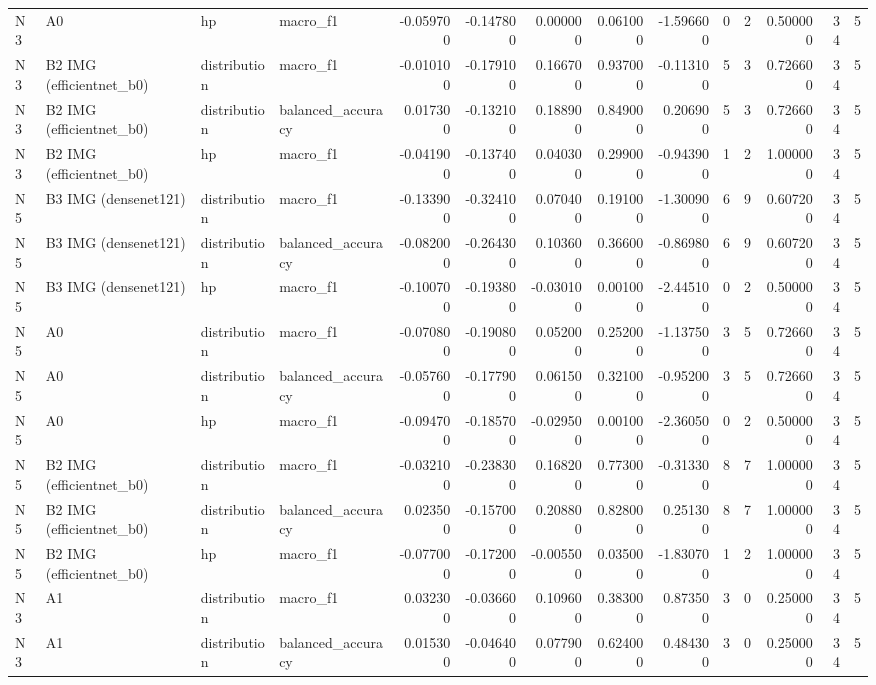 \begin{table}
\begin{tabular}{llllrrrrrrrrrr}
N3 & A0 & hp & macro\_f1 & -0.059700 & -0.147800 & 0.000000 & 0.061000 & -1.596600 & 0 & 2 & 0.500000 & 34 & 5 \\
N3 & B2 IMG (efficientnet\_b0) & distribution & macro\_f1 & -0.010100 & -0.179100 & 0.166700 & 0.937000 & -0.113100 & 5 & 3 & 0.726600 & 34 & 5 \\
N3 & B2 IMG (efficientnet\_b0) & distribution & balanced\_accuracy & 0.017300 & -0.132100 & 0.188900 & 0.849000 & 0.206900 & 5 & 3 & 0.726600 & 34 & 5 \\
N3 & B2 IMG (efficientnet\_b0) & hp & macro\_f1 & -0.041900 & -0.137400 & 0.040300 & 0.299000 & -0.943900 & 1 & 2 & 1.000000 & 34 & 5 \\
N5 & B3 IMG (densenet121) & distribution & macro\_f1 & -0.133900 & -0.324100 & 0.070400 & 0.191000 & -1.300900 & 6 & 9 & 0.607200 & 34 & 5 \\
N5 & B3 IMG (densenet121) & distribution & balanced\_accuracy & -0.082000 & -0.264300 & 0.103600 & 0.366000 & -0.869800 & 6 & 9 & 0.607200 & 34 & 5 \\
N5 & B3 IMG (densenet121) & hp & macro\_f1 & -0.100700 & -0.193800 & -0.030100 & 0.001000 & -2.445100 & 0 & 2 & 0.500000 & 34 & 5 \\
N5 & A0 & distribution & macro\_f1 & -0.070800 & -0.190800 & 0.052000 & 0.252000 & -1.137500 & 3 & 5 & 0.726600 & 34 & 5 \\
N5 & A0 & distribution & balanced\_accuracy & -0.057600 & -0.177900 & 0.061500 & 0.321000 & -0.952000 & 3 & 5 & 0.726600 & 34 & 5 \\
N5 & A0 & hp & macro\_f1 & -0.094700 & -0.185700 & -0.029500 & 0.001000 & -2.360500 & 0 & 2 & 0.500000 & 34 & 5 \\
N5 & B2 IMG (efficientnet\_b0) & distribution & macro\_f1 & -0.032100 & -0.238300 & 0.168200 & 0.773000 & -0.313300 & 8 & 7 & 1.000000 & 34 & 5 \\
N5 & B2 IMG (efficientnet\_b0) & distribution & balanced\_accuracy & 0.023500 & -0.157000 & 0.208800 & 0.828000 & 0.251300 & 8 & 7 & 1.000000 & 34 & 5 \\
N5 & B2 IMG (efficientnet\_b0) & hp & macro\_f1 & -0.077000 & -0.172000 & -0.005500 & 0.035000 & -1.830700 & 1 & 2 & 1.000000 & 34 & 5 \\
N3 & A1 & distribution & macro\_f1 & 0.032300 & -0.036600 & 0.109600 & 0.383000 & 0.873500 & 3 & 0 & 0.250000 & 34 & 5 \\
N3 & A1 & distribution & balanced\_accuracy & 0.015300 & -0.046400 & 0.077900 & 0.624000 & 0.484300 & 3 & 0 & 0.250000 & 34 & 5 \\

\end{tabular}
\end{table}
